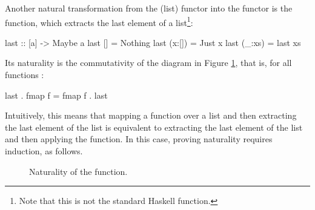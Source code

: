 \begin{example}
  \label{ex:natural-last-haskell}

  Another natural transformation from the \texthaskell{[]} (list)
  functor into the  functor is the
   function, which extracts the last element of a
  list\footnote{Note that this is not the standard Haskell
     function.}:
  \begin{codehaskell}
last :: [a] -> Maybe a
last []     = Nothing
last (x:[]) = Just x
last (_:xs) = last xs
  \end{codehaskell}
  Its naturality is the commutativity of the diagram in Figure
  \ref{fig:naturality-last-haskell}, that is, for all functions
  :
  \begin{codehaskell}
last . fmap f = fmap f . last
  \end{codehaskell}
  Intuitively, this means that mapping a function over a list and then
  extracting the last element of the list is equivalent to extracting
  the last element of the list and then applying the function. In this
  case, proving naturality requires induction, as follows.

  \begin{figure}[htb]
    \begin{center}
    \end{center}
    \caption{Naturality of the  function.}
    \label{fig:naturality-last-haskell}
  \end{figure}


\end{example}
